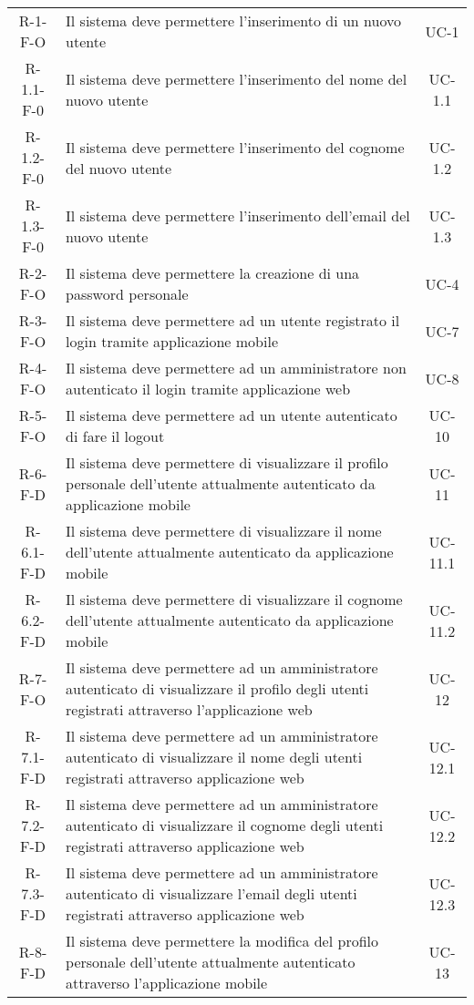 \begin{longtable}{ c C{9cm} c }
    R-1-F-O & Il sistema deve permettere l'inserimento di un nuovo utente & UC-1 \\
    R-1.1-F-0 & Il sistema deve permettere l'inserimento del nome del nuovo utente & UC-1.1 \\
    R-1.2-F-0 & Il sistema deve permettere l'inserimento del cognome del nuovo utente & UC-1.2 \\
    R-1.3-F-0 & Il sistema deve permettere l'inserimento dell'email del nuovo utente & UC-1.3 \\
    R-2-F-O & Il sistema deve permettere la creazione di una password personale & UC-4 \\
    R-3-F-O & Il sistema deve permettere ad un utente registrato il login tramite applicazione mobile & UC-7 \\
    R-4-F-O & Il sistema deve permettere ad un amministratore non autenticato il login tramite applicazione web & UC-8 \\
    R-5-F-O & Il sistema deve permettere ad un utente autenticato di fare il logout & UC-10 \\
    R-6-F-D & Il sistema deve permettere di visualizzare il profilo personale dell'utente attualmente autenticato da applicazione mobile & UC-11 \\
    R-6.1-F-D & Il sistema deve permettere di visualizzare il nome dell'utente attualmente autenticato da applicazione mobile & UC-11.1 \\
    R-6.2-F-D & Il sistema deve permettere di visualizzare il cognome dell'utente attualmente autenticato da applicazione mobile & UC-11.2 \\
    R-7-F-O & Il sistema deve permettere ad un amministratore autenticato di visualizzare il profilo degli utenti registrati attraverso l'applicazione web & UC-12 \\
    R-7.1-F-D & Il sistema deve permettere ad un amministratore autenticato di visualizzare il nome degli utenti registrati attraverso applicazione web & UC-12.1 \\
    R-7.2-F-D & Il sistema deve permettere ad un amministratore autenticato di visualizzare il cognome degli utenti registrati attraverso applicazione web & UC-12.2 \\
    R-7.3-F-D & Il sistema deve permettere ad un amministratore autenticato di visualizzare l'email degli utenti registrati attraverso applicazione web & UC-12.3 \\
    R-8-F-D & Il sistema deve permettere la modifica del profilo personale dell'utente attualmente autenticato attraverso l'applicazione mobile & UC-13 \\

\end{longtable}
